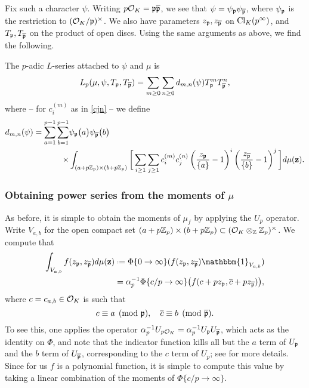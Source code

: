\documentclass[a4paper,11pt]{article}
\numberwithin{equation}{section}
\begin{document}
Fix such a character $\psi$. Writing $p\mathcal{O}_K = \mathfrak{p}\overline{\mathfrak{p}}$, we see that $\psi = \psi_{\mathfrak{p}}\psi_{\overline{\mathfrak{p}}}$, where $\psi_{\mathfrak{p}}$ is the restriction to $(\mathcal{O}_K/\mathfrak{p})^\times$. We also have parameters $z_{\mathfrak{p}}, z_{\overline{\mathfrak{p}}}$ on $\mathrm{Cl}_K(p^\infty)$, and $T_{\mathfrak{p}}, T_{\overline{\mathfrak{p}}}$ on the product of open discs. Using the same arguments as above, we find the following.

\begin{proposition}
The $p$-adic $L$-series attached to $\psi$ and $\mu$ is
\[
	L_p(\mu,\psi,T_{\mathfrak{p}},T_{\overline{\mathfrak{p}}}) = \sum_{m\geq 0}\sum_{n\geq 0} d_{m,n}(\psi) T_{\mathfrak{p}}^mT_{\overline{\mathfrak{p}}}^n,
\]
where -- for $c_i^{(m)}$ as in \eqref{cjn} -- we define
\begin{align*} 
    d_{m,n}(\psi) = \sum_{a=1}
^{p-1}\sum_{b=1}^{p-1} &\psi_{\mathfrak{p}}\big(a\big) \psi_{\overline{\mathfrak{p}}}\big(b\big) \\
\times &\int_{(a+p\mathbb{Z}_p) \times (b+p\mathbb{Z}_p)} \bigg[ \sum_{i\geq 1} \sum_{j\geq 1} c_i^{(m)} c_j^{(n)} \left(\frac{z_{\mathfrak{p}}}{\{a\}}-1\right)^i \left(\frac{z_{\overline{\mathfrak{p}}}}{\{b\}}-1\right)^j \bigg]d\mu(\mathbf{z}) .
\end{align*}
\end{proposition}

\subsubsection{Obtaining power series from the moments of \texorpdfstring{$\mu$}{mu}}
As before, it is simple to obtain the moments of $\mu_f$ by applying the $U_p$ operator. Write $V_{a,b}$ for the open compact set $(a+p\mathbb{Z}_p)\times(b+p\mathbb{Z}_p) \subset (\mathcal{O}_K\otimes_{\mathbb{Z}}\mathbb{Z}_p)^\times$. We compute that
\begin{align*}
	\int_{V_{a,b}}f(z_{\pri},z_{\pribar}) d\mu(\mathbf{z}) &\defeq \Phi\{0\rightarrow\infty\}(f(z_{\pri},z_{\pribar})\mathbbm{1}_{V_{a,b}}) \\
    &= \alpha_{p}^{-1}\Phi\{c/p \rightarrow \infty\}\big(f(c + pz_{\pri}, \overline{c} + pz_{\pribar})\big),
    \end{align*}
where $c = c_{a,b} \in \mathcal{O}_K$ is such that
\[
	c \equiv a \pmod{\mathfrak{p}},\quad \overline{c}\equiv b\pmod{\overline{\mathfrak{p}}}.
\]
To see this, one applies the operator $\alpha_p^{-1}U_{p\mathcal{O}_K} = \alpha_p^{-1}U_{\mathfrak{p}}U_{\overline{\mathfrak{p}}}$, which acts as the identity on $\Phi$, and note that the indicator function kills all but the $a$ term of $U_{\mathfrak{p}}$ and the $b$ term of $U_{\overline{\mathfrak{p}}}$, corresponding to the $c$ term of $U_p$; see \cite[\S7.1]{Wil17} for more details. Since for us $f$ is a polynomial function, it is simple to compute this value by taking a linear combination of the moments of $\Phi\{c/p\rightarrow \infty\}$.
\end{document}
